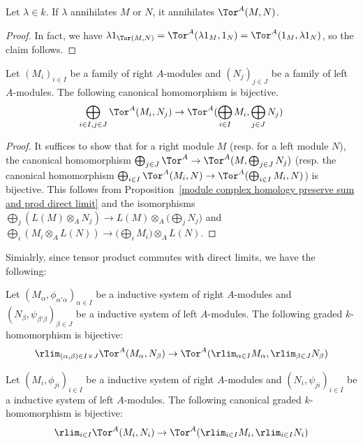 \begin{corollary}\label{module twisted product annihilator prop}
Let $\lambda\in k$. If $\lambda$ annihilates $M$ or $N$, it annihilates $\Tor^A(M,N)$.
\end{corollary}
\begin{proof}
In fact, we have $\lambda 1_{\Tor(M,N)}=\Tor^A(\lambda 1_M,1_N)=\Tor^A(1_M,\lambda 1_N)$, so the claim follows.
\end{proof}
\begin{proposition}\label{module twisted product and direct sum}
Let $(M_i)_{i\in I}$ be a family of right $A$-modules and $(N_j)_{j\in J}$ be a family of left $A$-modules. The following canonical homomorphism is bijective.
\[\bigoplus_{i\in I,j\in J}\Tor^A(M_i,N_j)\to\Tor^A(\bigoplus_{i\in I}M_i,\bigoplus_{j\in J}N_j)\]
\end{proposition}
\begin{proof}
It suffices to show that for a right module $M$ (resp. for a left module $N$), the canonical homomorphism $\bigoplus_{j\in J}\Tor^A\to\Tor^A(M,\bigoplus_{j\in J}N_j)$ (resp. the canonical homomorphism $\bigoplus_{i\in I}\Tor^A(M_i,N)\to\Tor^A(\bigoplus_{i\in I}M_i,N)$) is bijective. This follows from Proposition~\ref{module complex homology preserve sum and prod direct limit} and the isomorphisms $\bigoplus_j(L(M)\otimes_AN_j)\to L(M)\otimes_A\big(\bigoplus_jN_j\big)$ and $\bigoplus_i(M_i\otimes_AL(N))\to\big(\bigoplus_iM_i\big)\otimes_AL(N)$.
\end{proof}
Simialrly, since tensor product commutes with direct limits, we have the following:
\begin{proposition}\label{module twisted product and direct limit}
Let $(M_\alpha,\phi_{\alpha'\alpha})_{\alpha\in I}$ be a inductive system of right $A$-modules and $(N_\beta,\psi_{\beta'\beta})_{\beta\in J}$ be a inductive system of left $A$-modules. The following graded $k$-homomorphism is bijective:
\[\rlim_{(\alpha,\beta)\in I\times J}\Tor^A(M_\alpha,N_\beta)\to\Tor^A(\rlim_{\alpha\in I}M_\alpha,\rlim_{\beta\in J}N_\beta)\]
\end{proposition}
\begin{corollary}
Let $(M_i,\phi_{ji})_{i\in I}$ be a inductive system of right $A$-modules and $(N_i,\psi_{ji})_{i\in I}$ be a inductive system of left $A$-modules. The following canonical graded $k$-homomorphism is bijective:
\[\rlim_{i\in I}\Tor^A(M_i,N_i)\to\Tor^A(\rlim_{i\in I}M_i,\rlim_{i\in I}N_i)\]
\end{corollary}
